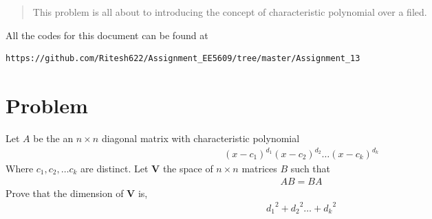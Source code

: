 \documentclass[journal,12pt,twocolumn]{IEEEtran}
\begin{document}
	
	\maketitle
	\newpage
	\bigskip
	\renewcommand{\thefigure}{\theenumi}
	\renewcommand{\thetable}{\theenumi}
	\date{Today}
	

\begin{abstract}
This problem is all about to  introducing the concept of characteristic polynomial over a filed.
\end{abstract}
All the codes for this document can be found at
\begin{lstlisting}
https://github.com/Ritesh622/Assignment_EE5609/tree/master/Assignment_13
\end{lstlisting}
\section{Problem}
Let $A$ be the an $n \times n$ diagonal matrix with characteristic polynomial
\begin{align}
(x-c_1)^{d_1} (x-c_2)^{d_2} \dots (x-c_k)^{d_k} \label{1.1}
\end{align}
Where $c_1, c_2,  \dots c_k $ are distinct. Let $\mathbf{V}$ the space of $n \times n$ matrices $B$ such that 
\begin{align}
AB = BA \label{1.2}
\end{align}
Prove that the dimension of $\mathbf{V}$ is,
\begin{align}
{d_1}^2 + {d_2}^2 \dots + {d_k}^2 \label{1.3}
\end{align}
\end{document}
